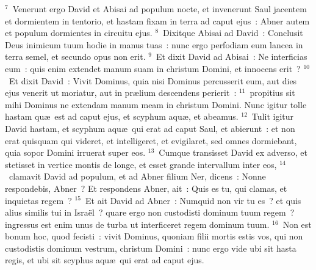 ${}^{7}$~Venerunt ergo David et Abisai ad populum nocte, et invenerunt Saul jacentem et dormientem in tentorio, et hastam fixam in terra ad caput ejus~: Abner autem et populum dormientes in circuitu ejus.
${}^{8}$~Dixitque Abisai ad David~: Conclusit Deus inimicum tuum hodie in manus tuas~: nunc ergo perfodiam eum lancea in terra semel, et secundo opus non erit.
${}^{9}$~Et dixit David ad Abisai~: Ne interficias eum~: quis enim extendet manum suam in christum Domini, et innocens erit~?
${}^{10}$~Et dixit David~: Vivit Dominus, quia nisi Dominus percusserit eum, aut dies ejus venerit ut moriatur, aut in pr\ae lium descendens perierit~:
${}^{11}$~propitius sit mihi Dominus ne extendam manum meam in christum Domini. Nunc igitur tolle hastam qu\ae\ est ad caput ejus, et scyphum aqu\ae , et abeamus.
${}^{12}$~Tulit igitur David hastam, et scyphum aqu\ae\ qui erat ad caput Saul, et abierunt~: et non erat quisquam qui videret, et intelligeret, et evigilaret, sed omnes dormiebant, quia sopor Domini irruerat super eos.
${}^{13}$~Cumque transisset David ex adverso, et stetisset in vertice montis de longe, et esset grande intervallum inter eos,
${}^{14}$~clamavit David ad populum, et ad Abner filium Ner, dicens~: Nonne respondebis, Abner~? Et respondens Abner, ait~: Quis es tu, qui clamas, et inquietas regem~?
${}^{15}$~Et ait David ad Abner~: Numquid non vir tu es~? et quis alius similis tui in Isra\"el~? quare ergo non custodisti dominum tuum regem~? ingressus est enim unus de turba ut interficeret regem dominum tuum.
${}^{16}$~Non est bonum hoc, quod fecisti~: vivit Dominus, quoniam filii mortis estis vos, qui non custodistis dominum vestrum, christum Domini~: nunc ergo vide ubi sit hasta regis, et ubi sit scyphus aqu\ae\ qui erat ad caput ejus.


